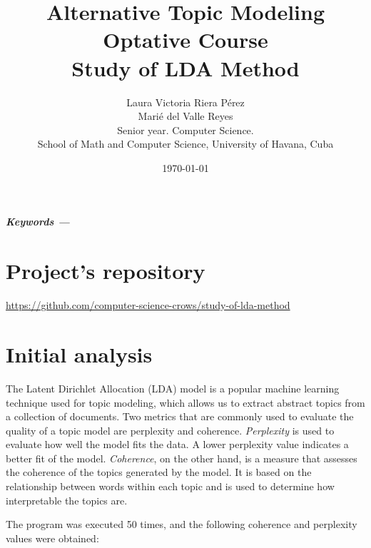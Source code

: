 \documentclass[10pt]{article} %
\title{\normalsize{Alternative Topic Modeling Optative Course}\\
	\Huge\bfseries Study of LDA Method \\
} %
\author{%
	Laura Victoria Riera P\'erez\\
	Mari\'e del Valle Reyes \vspace{1em} \\
	\small Senior year. Computer Science. \\ %
	\small School of Math and Computer Science, University of Havana, Cuba \\ %
}
\date{\footnotesize \today } %
\providecommand{\keywords}[1]
{
	\small	
	\vspace{0.5em}
	\noindent \textbf{\textit{Keywords --- }} #1
}
\renewenvironment{abstract}
{\small
	\begin{center}
		\bfseries \abstractname\vspace{-.5em}\vspace{0pt}
	\end{center}
	\list{}{
		\setlength{\leftmargin}{1.5cm}%
		\setlength{\rightmargin}{\leftmargin}%
	}%
	\item\relax}
{\endlist}
\begin{document}
	\maketitle
	
	\begin{abstract}
		\lipsum[1]
		
		\keywords{}
	\end{abstract}

	\section*{Project's repository}
	
	\begin{center}
		\href{https://github.com/computer-science-crows/study-of-lda-method}{https://github.com/computer-science-crows/study-of-lda-method}
	\end{center}
	
	\section{Initial analysis}
	
	The Latent Dirichlet Allocation (LDA) model is a popular machine learning technique used for topic modeling, which allows us to extract abstract topics from a collection of documents. Two metrics that are commonly used to evaluate the quality of a topic model are perplexity and coherence.
	\textit{Perplexity} is used to evaluate how well the model fits the data. A lower perplexity value indicates a better fit of the model. \textit{Coherence}, on the other hand, is a measure that assesses the coherence of the topics generated by the model. It is based on the relationship between words within each topic and is used to determine how interpretable the topics are. 
	
	The program was executed 50 times, and the following coherence and perplexity values were obtained:
	
\end{document}
